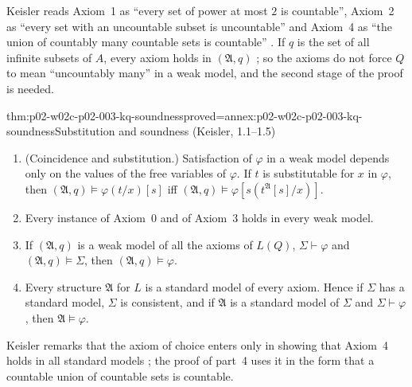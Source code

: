Keisler reads Axiom~1 as ``every set of power at most \(2\) is
countable'', Axiom~2 as ``every set with an uncountable subset is
uncountable'' and Axiom~4 as ``the union of countably many countable sets
is countable'' \cite[\S1, p.~6]{Keisler1970}.  If \(q\) is the set of all
infinite subsets of \(A\), every axiom holds in \((\mathfrak A,q)\)
\cite[\S1, p.~7]{Keisler1970}; so the axioms do not force \(Q\) to mean
``uncountably many'' in a weak model, and the second stage of the proof is
needed.

\begin{hblemma}{thm:p02-w02c-p02-003-kq-soundness}{proved=annex:p02-w02c-p02-003-kq-soundness}{Substitution and soundness (Keisler, 1.1--1.5)}
\begin{enumerate}
\item (Coincidence and substitution.)  Satisfaction of \(\varphi\) in a weak
      model depends only on the values of the free variables of
      \(\varphi\).  If \(t\) is substitutable for \(x\) in \(\varphi\), then
      \((\mathfrak A,q)\models\varphi(t/x)[s]\) iff
      \((\mathfrak A,q)\models\varphi[s(t^{\mathfrak A}[s]/x)]\).
\item Every instance of Axiom~0 and of Axiom~3 holds in every weak model.
\item If \((\mathfrak A,q)\) is a weak model of all the axioms of
      \(L(Q)\), \(\Sigma\vdash\varphi\) and \((\mathfrak A,q)\models\Sigma\),
      then \((\mathfrak A,q)\models\varphi\).
\item Every structure \(\mathfrak A\) for \(L\) is a standard model of
      every axiom.  Hence if \(\Sigma\) has a standard model, \(\Sigma\) is
      consistent, and if \(\mathfrak A\) is a standard model of \(\Sigma\)
      and \(\Sigma\vdash\varphi\), then \(\mathfrak A\models\varphi\).
\end{enumerate}
\end{hblemma}

Keisler remarks that the axiom of choice enters only in showing that
Axiom~4 holds in all standard models \cite[\S1, p.~7]{Keisler1970}; the
proof of part~4 uses it in the form that a countable union of countable
sets is countable.

